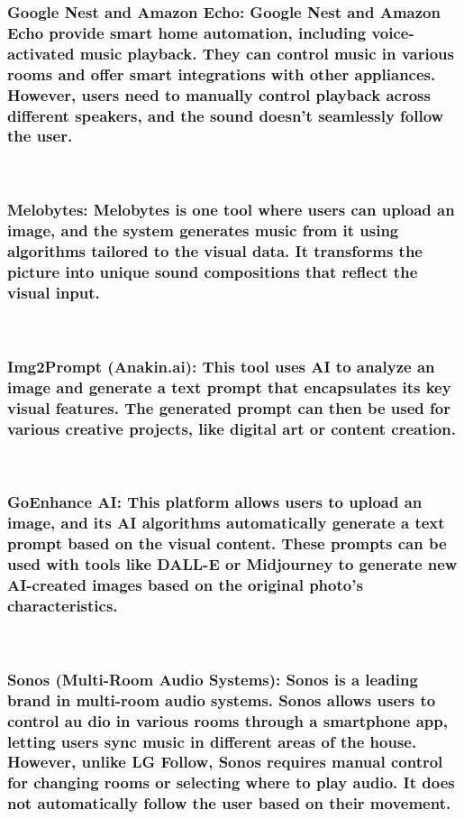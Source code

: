 \documentclass[conference]{IEEEtran}
\begin{document}
\subsubsection{Google Nest and Amazon Echo: Google Nest and Amazon Echo provide smart home automation, including voice-activated music playback. They can control music in various rooms and offer smart integrations with other appliances. However, users need to manually control playback across different speakers, and the sound doesn’t seamlessly follow the user. }

\
\
\subsubsection{Melobytes: Melobytes is one tool where users can upload an image, and the system generates music from it using algorithms tailored to the visual data. It transforms the picture into unique sound compositions that reflect the visual input.}
\

\subsubsection{Img2Prompt (Anakin.ai): This tool uses AI to analyze an image and generate a text prompt that encapsulates its key visual features. The generated prompt can then be used for various creative projects, like digital art or content creation.}
\

\subsubsection{GoEnhance AI: This platform allows users to upload an image, and its AI algorithms automatically generate a text prompt based on the visual content. These prompts can be used with tools like DALL-E or Midjourney to generate new AI-created images based on the original photo's characteristics.}
\

\subsubsection{Sonos (Multi-Room Audio Systems): Sonos is a leading brand in multi-room audio systems. Sonos allows users to control au     dio in various rooms through a smartphone app, letting users sync music in different areas of the house. However, unlike LG Follow, Sonos requires manual control for changing rooms or selecting where to play audio. It does not automatically follow the user based on their movement.}
\
\end{document}
